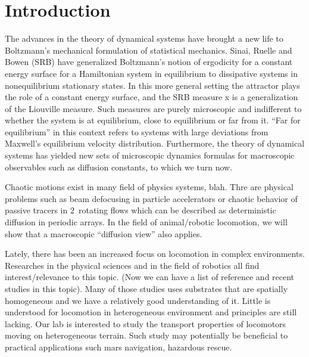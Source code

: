 \documentclass[aps,pre,preprint,groupedaddress, floatfix]{revtex4-1}
\begin{document}
\section{Introduction}

The advances in the theory of dynamical systems have brought a new life to
Boltzmann's mechanical formulation of statistical mechanics. Sinai, Ruelle and
Bowen (SRB) have generalized Boltzmann's notion of ergodicity for a constant
energy surface for a Hamiltonian system in equilibrium to dissipative systems in
{nonequilibrium} stationary states. In this more general setting the attractor
plays the role of a constant energy surface, and the SRB measure x is a
generalization of the Liouville measure. Such measures are purely microscopic
and indifferent to whether the system is at equilibrium, close to equilibrium or
far from it.  ``Far for equilibrium'' in this context refers to systems with
large deviations from Maxwell's equilibrium velocity distribution. Furthermore,
the theory of dynamical systems has yielded new sets of microscopic dynamics
formulas for macroscopic observables such as diffusion constants, to which we turn now.
%
%

Chaotic motions exist in many field of physics systems, blah. Thre are physical
problems such as beam defocusing in particle accelerators or chaotic behavior of
passive tracers in $2$\dmn\ rotating flows which can be described as
deterministic diffusion in periodic arrays. In the field of animal/robotic
locomotion, we will show that a macroscopic ``diffusion view'' also applies.

Lately, there has been an increased focus on locomotion in complex environments. Researches in the physical sciences and in the field of robotics all find interest/relevance to this topic. (Now we can have a list of reference and recent studies in this topic). Many of those studies uses substrates that are spatially homogeneous and we have a relatively good understanding of it. Little is understood for locomotion in heterogeneous environment and principles are still lacking. Our lab is interested to study the transport properties of locomotors moving on heterogeneous terrain. Such study may potentially be beneficial to practical applications such mars navigation, hazardous rescue.
\end{document}
